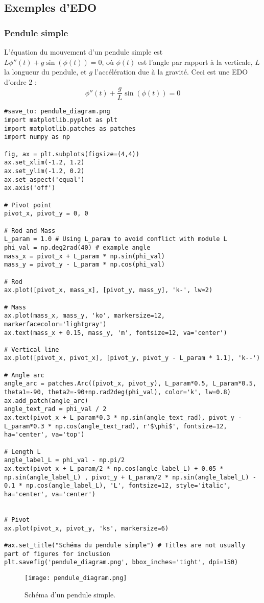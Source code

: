 \subsection{Exemples d'EDO}
\label{ssec:exemples_edo}

\subsubsection{Pendule simple}
\label{sssec:pendule}
L'équation du mouvement d'un pendule simple est $L\phi''(t) + g \sin(\phi(t)) = 0$, où $\phi(t)$ est l'angle par rapport à la verticale, $L$ la longueur du pendule, et $g$ l'accélération due à la gravité. Ceci est une EDO d'ordre 2 :
\[ \phi''(t) + \frac{g}{L} \sin(\phi(t)) = 0 \]

\begin{verbatim}
#save_to: pendule_diagram.png
import matplotlib.pyplot as plt
import matplotlib.patches as patches
import numpy as np

fig, ax = plt.subplots(figsize=(4,4))
ax.set_xlim(-1.2, 1.2)
ax.set_ylim(-1.2, 0.2)
ax.set_aspect('equal')
ax.axis('off')

# Pivot point
pivot_x, pivot_y = 0, 0

# Rod and Mass
L_param = 1.0 # Using L_param to avoid conflict with module L
phi_val = np.deg2rad(40) # example angle
mass_x = pivot_x + L_param * np.sin(phi_val)
mass_y = pivot_y - L_param * np.cos(phi_val)

# Rod
ax.plot([pivot_x, mass_x], [pivot_y, mass_y], 'k-', lw=2)

# Mass
ax.plot(mass_x, mass_y, 'ko', markersize=12, markerfacecolor='lightgray')
ax.text(mass_x + 0.15, mass_y, 'm', fontsize=12, va='center')

# Vertical line
ax.plot([pivot_x, pivot_x], [pivot_y, pivot_y - L_param * 1.1], 'k--')

# Angle arc
angle_arc = patches.Arc((pivot_x, pivot_y), L_param*0.5, L_param*0.5, theta1=-90, theta2=-90+np.rad2deg(phi_val), color='k', lw=0.8)
ax.add_patch(angle_arc)
angle_text_rad = phi_val / 2
ax.text(pivot_x + L_param*0.3 * np.sin(angle_text_rad), pivot_y - L_param*0.3 * np.cos(angle_text_rad), r'$\phi$', fontsize=12, ha='center', va='top')

# Length L
angle_label_L = phi_val - np.pi/2
ax.text(pivot_x + L_param/2 * np.cos(angle_label_L) + 0.05 * np.sin(angle_label_L) , pivot_y + L_param/2 * np.sin(angle_label_L) - 0.1 * np.cos(angle_label_L), 'L', fontsize=12, style='italic', ha='center', va='center')


# Pivot
ax.plot(pivot_x, pivot_y, 'ks', markersize=6)

#ax.set_title("Schéma du pendule simple") # Titles are not usually part of figures for inclusion
plt.savefig('pendule_diagram.png', bbox_inches='tight', dpi=150)
\end{verbatim}
\begin{figure}[h]
\centering
\texttt{[image: pendule\_diagram.png]}
\caption{Schéma d'un pendule simple.}
\label{fig:pendule_diagram}
\end{figure}


